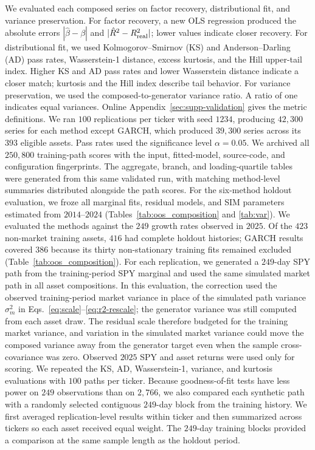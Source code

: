 We evaluated each composed series on factor recovery, distributional
fit, and variance preservation. For factor recovery, a new OLS
regression produced the absolute errors $|\hat\beta-\beta|$ and
$|\hat R^2-R^2_{\mathrm{real}}|$; lower values indicate closer recovery. For
distributional fit, we used
Kolmogorov--Smirnov (KS) and Anderson--Darling (AD) pass rates,
Wasserstein-1 distance, excess kurtosis, and the Hill upper-tail index.
Higher KS and AD pass rates and lower Wasserstein distance indicate a
closer match; kurtosis and the Hill index describe tail behavior.
For variance preservation, we used the composed-to-generator variance
ratio. A ratio of one indicates equal variances.
Online Appendix~\ref{sec:supp-validation} gives the metric definitions.
We ran $100$ replications per ticker with seed $1234$, producing
$42{,}300$ series for each method except GARCH, which produced
$39{,}300$ series across its $393$ eligible assets. Pass rates used the significance level
$\alpha=0.05$.
We archived all $250{,}800$ training-path scores with the input,
fitted-model, source-code, and configuration fingerprints. The aggregate,
branch, and loading-quartile tables were generated from this same
validated run, with matching method-level summaries distributed
alongside the path scores.
For the six-method holdout evaluation, we froze all marginal fits,
residual models, and SIM parameters estimated from $2014$--$2024$
(Tables~\ref{tab:oos_composition} and \ref{tab:var}). We evaluated the
methods against the
$249$ growth rates observed in $2025$. Of the $423$ non-market
training assets, $416$ had complete holdout histories; GARCH results
covered $386$ because its thirty non-stationary training fits remained
excluded (Table~\ref{tab:oos_composition}). For each replication, we generated a $249$-day SPY path
from the training-period SPY marginal and used the same simulated
market path in all asset compositions. In this evaluation, the
correction used the observed training-period market variance in place
of the simulated path variance $\sigma_m^2$ in
Eqs.~\eqref{eq:scale}--\eqref{eq:r2-rescale}; the generator variance
was still computed from each asset draw. The residual scale therefore
budgeted for the training market variance, and variation in the
simulated market variance could move the composed variance away from
the generator target even when the sample cross-covariance was zero.
Observed $2025$ SPY and asset returns were used only for scoring. We repeated the KS, AD,
Wasserstein-1, variance, and kurtosis evaluations with $100$ paths per
ticker. Because goodness-of-fit tests have less power on $249$
observations than on $2{,}766$, we also compared each synthetic path
with a randomly selected contiguous $249$-day block from the training
history. We first averaged replication-level results within ticker
and then summarized across tickers so each asset received equal
weight. The $249$-day training blocks provided a comparison at the
same sample length as the holdout period.

